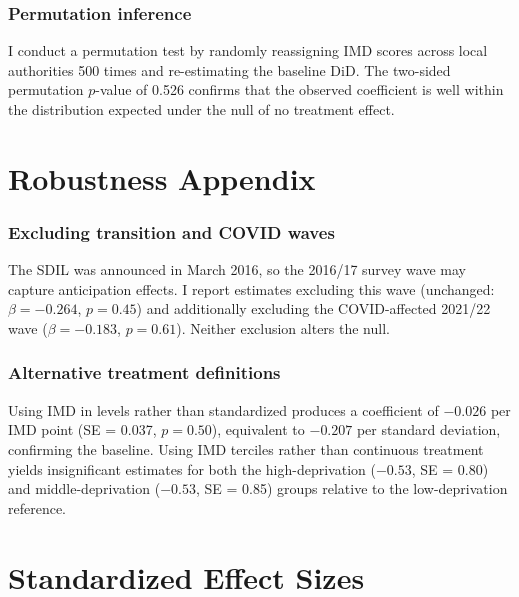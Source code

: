 \documentclass[12pt]{article}
\begin{document}
\subsubsection*{Permutation inference} I conduct a permutation test by randomly reassigning IMD scores across local authorities 500 times and re-estimating the baseline DiD. The two-sided permutation $p$-value of 0.526 confirms that the observed coefficient is well within the distribution expected under the null of no treatment effect.


\section{Robustness Appendix}

\subsubsection*{Excluding transition and COVID waves} The SDIL was announced in March 2016, so the 2016/17 survey wave may capture anticipation effects. I report estimates excluding this wave (unchanged: $\beta = -0.264$, $p = 0.45$) and additionally excluding the COVID-affected 2021/22 wave ($\beta = -0.183$, $p = 0.61$). Neither exclusion alters the null.

\subsubsection*{Alternative treatment definitions} Using IMD in levels rather than standardized produces a coefficient of $-0.026$ per IMD point (SE = 0.037, $p = 0.50$), equivalent to $-0.207$ per standard deviation, confirming the baseline. Using IMD terciles rather than continuous treatment yields insignificant estimates for both the high-deprivation ($-0.53$, SE = 0.80) and middle-deprivation ($-0.53$, SE = 0.85) groups relative to the low-deprivation reference.


\section{Standardized Effect Sizes}
\label{sec:sde}


\end{document}
